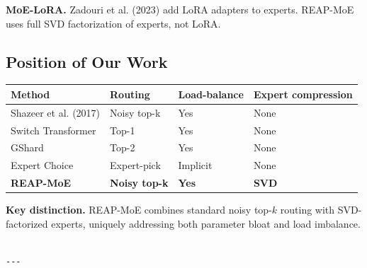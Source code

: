 \textbf{MoE-LoRA.} Zadouri et al. (2023) add LoRA adapters to experts. REAP-MoE 
uses full SVD factorization of experts, not LoRA.

\subsection{Position of Our Work}

\begin{table}[H]
\centering
\small
\begin{tabular}{llll}
\toprule
\textbf{Method} & \textbf{Routing} & \textbf{Load-balance} & \textbf{Expert compression} \\
\midrule
Shazeer et al. (2017) & Noisy top-k & Yes & None \\
Switch Transformer & Top-1 & Yes & None \\
GShard & Top-2 & Yes & None \\
Expert Choice & Expert-pick & Implicit & None \\
\textbf{REAP-MoE} & \textbf{Noisy top-k} & \textbf{Yes} & \textbf{SVD} \\
\bottomrule
\end{tabular}
\end{table}

\textbf{Key distinction.} REAP-MoE combines standard noisy top-$k$ routing with 
SVD-factorized experts, uniquely addressing both parameter bloat and load 
imbalance.
\begin{lstlisting}

---
\end{lstlisting}